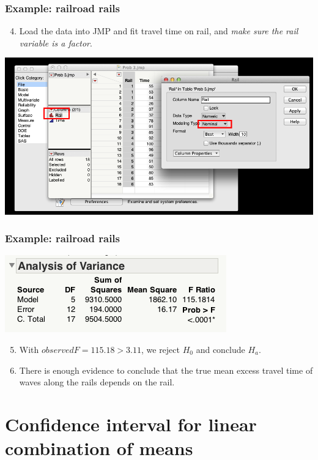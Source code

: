 \documentclass[handout]{beamer}\usepackage[]{graphicx}\usepackage[]{color}
\numberwithin{equation}{section}
\begin{document}
\begin{frame}
\frametitle{Example: railroad rails}
\begin{enumerate}
\setcounter{enumi}{3}
\item Load the data into JMP and fit travel time on rail, and \emph{make sure the rail variable is a factor}.
\end{enumerate}
\begin{center}
 \includegraphics{../../fig/nominalrail.png}
\end{center}
\end{frame}


\begin{frame}
\frametitle{Example: railroad rails}
\begin{center}
 \includegraphics{../../fig/railanova.png}
\end{center}
\begin{enumerate}[1. ]
\setcounter{enumi}{4}
\item With $observedF = 115.18 > 3.11$, we reject $H_0$ and conclude $H_a$.
\pause \item There is enough evidence to conclude that the true mean excess travel time of waves along the rails depends on the rail.
\end{enumerate}
\end{frame}

\section{Confidence interval for linear combination of means}
\end{document}
